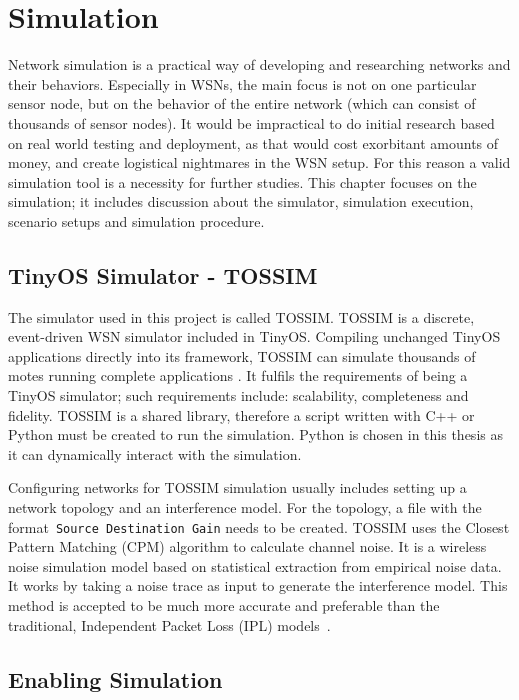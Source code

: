 \chapter{Simulation}
\label{Sim}
Network simulation is a practical way of developing and researching networks and their
behaviors. Especially in WSNs, the main focus is not on one particular sensor node, but on
the behavior of the entire network (which can consist of thousands of sensor nodes). It would
be impractical to do initial research based on real world testing and deployment, as that would cost exorbitant amounts of money, and create logistical nightmares in the WSN setup. For this reason a valid
simulation tool is a necessity for further studies. This chapter focuses on the simulation; it 
includes discussion about the simulator, simulation execution, scenario setups and simulation procedure.

\section{TinyOS Simulator - TOSSIM}
\label{Sim:TOSSIM}

The simulator used in this project is called TOSSIM\@. TOSSIM is a discrete, event-driven WSN simulator included in TinyOS. Compiling unchanged TinyOS applications
directly into its framework, TOSSIM can simulate thousands of motes running complete
applications \cite{LLWC}. It fulfils the requirements of being a TinyOS simulator; such requirements include: scalability, completeness and fidelity. TOSSIM is a shared library, therefore a script written with C++ or Python must be created to run the simulation.  Python is chosen in this thesis as it can dynamically interact with the simulation.

Configuring networks for TOSSIM simulation usually includes setting
up a network topology and an interference model. For the topology, a file with the format~\texttt{Source Destination Gain} needs to be created. TOSSIM uses the Closest Pattern Matching (CPM) algorithm to calculate channel noise. It is a wireless noise simulation model
based on statistical extraction from empirical noise data. It works by taking a noise trace as input to generate the interference model. This method is accepted to be much more accurate and preferable than the traditional, Independent Packet Loss (IPL) models~\cite{TOSSIM}.

\section{Enabling Simulation}
\label{Sim:Enabling}

